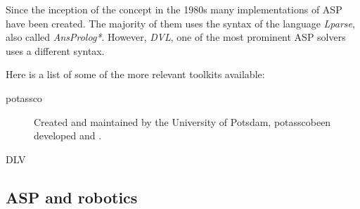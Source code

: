 Since the inception of the concept in the 1980s \citep{Gelf88a} many implementations of ASP have been created.
The majority of them uses the syntax of the language \textit{Lparse}, also called \textit{AnsProlog*}. 
However, \textit{DVL}, one of the most prominent ASP solvers uses a different syntax.

Here is a list of some of the more relevant toolkits available:

\begin{description}
\item[potassco] Created and maintained by the University of Potsdam, potasscobeen developed and \citep{gekakaosscsc11a}.
\item[DLV]
\end{description}

\subsection{ASP and robotics}




